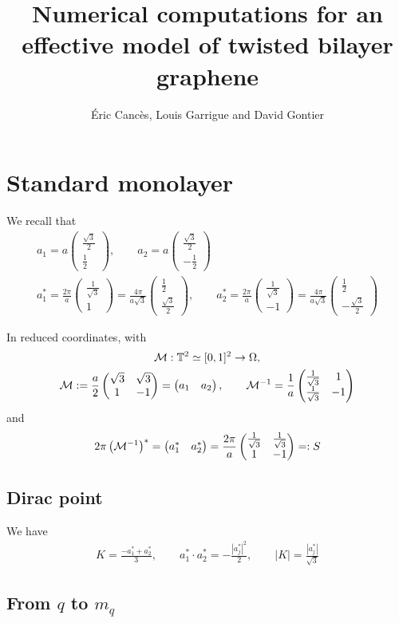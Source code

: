 \documentclass[11pt,a4paper,reqno,french,tikz]{amsart}
\title[Numerics effective TBG]{Numerical computations for an effective model of twisted bilayer graphene}
\author[É. Cancès, L. Garrigue and D. Gontier]{Éric Cancès, Louis Garrigue and David Gontier}
\newcommand{\pa}[1]{\left( #1 \right)} %
\newcommand{\ab}[1]{\left|#1\right|} %
\newcommand{\f}[2]{\frac{#1}{#2}} %
\newcommand{\mat}[1]{\begin{pmatrix} #1 \end{pmatrix}} %
\begin{document}
\maketitle

\section{Standard monolayer}%
\label{sec:standard_monolayer}

We recall that 
\begin{multline*}
a_1 = a \mat{ \f{\sqrt 3}2 \\ \f 12}, \qquad a_2 = a \mat{ \f{\sqrt 3}2 \\ -\f 12} \\
a^*_1 = \f{2\pi}{a} \mat{ \f{1}{\sqrt 3} \\ 1}= \f{4\pi}{a\sqrt{3}} \mat{ \f{1}{2} \\ \f{\sqrt{3}}{2}}, \qquad a^*_2 = \f{2\pi}{a} \mat{ \f{1}{\sqrt 3} \\ -1}= \f{4\pi}{a\sqrt{3}} \mat{ \f{1}{2} \\ -\f{\sqrt{3}}{2}}
\end{multline*}

In reduced coordinates, with 
\begin{multline*}
	\cM : \mathbb{T}^2 \simeq [0,1]^2 \rightarrow \Omega, \\
	\cM :=  \f a2 \mat{\sqrt{3} & \sqrt{3} \\ 1 & -1} = \mat{a_1 & a_2}, \qquad  \cM^{-1} = \f 1a \mat{\f 1{\sqrt 3} & 1 \\ \f 1{\sqrt 3} & -1}
\end{multline*}
and
\begin{align*}
	2\pi \pa{\cM^{-1}}^* = \mat{a_1^* & a_2^*} = \f{2\pi}a \mat{\f{1}{\sqrt 3} & \f{1}{\sqrt 3} \\ 1 & -1} =: S
\end{align*}

\subsection{Dirac point}%
\label{sub:dirac_point}

We have
\begin{align*}
K = \f{-a_1^* +a_2^*}{3}, \qquad a_1^*\cdot a_2^* = -\f{|a_j^*|^2}{2}, \qquad \ab{K} = \f{|a_j^*|}{\sqrt 3}
\end{align*}

\subsection{From $q$ to $m_q$}%
\label{sub:from_q_to_m_q_}
\end{document}
